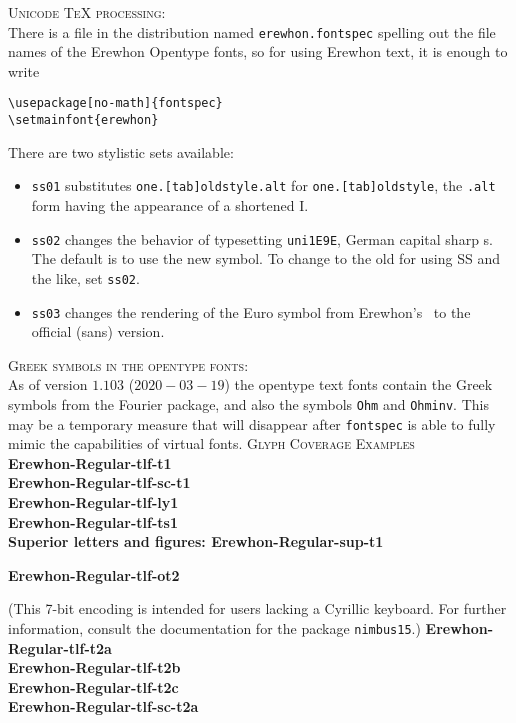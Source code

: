 \documentclass[11pt]{amsart}
\begin{document}
\textsc{Unicode TeX processing:}\\
There is a file in the distribution named {\tt erewhon.fontspec} spelling out the file names of the Erewhon Opentype fonts, so for using Erewhon text, it is enough to write
\begin{verbatim}
\usepackage[no-math]{fontspec}
\setmainfont{erewhon}
\end{verbatim}
There are two stylistic sets available:\\
\begin{itemize}
\item
{\tt ss01} substitutes {\tt one.[tab]oldstyle.alt} for {\tt one.[tab]oldstyle}, the {\tt .alt} form having the appearance of a shortened I.
\item
{\tt ss02} changes the behavior of typesetting {\tt uni1E9E}, German capital sharp s. The default is to use the new symbol. To change to the old for using SS and the like, set {\tt ss02}.
\item
{\tt ss03} changes the rendering of the Euro symbol from Erewhon's \texteuro\ to the official (sans) version.
\end{itemize} 



\textsc{Greek symbols in the opentype fonts:}\\
As of version $1.103$ ($2020-03-19$) the opentype text fonts contain the Greek symbols from the Fourier package, and also the symbols {\tt Ohm} and {\tt Ohminv}. This may be a temporary measure that will disappear after {\tt fontspec} is able to fully mimic the capabilities of virtual fonts.
\newpage
\textsc{Glyph Coverage Examples}\\
\textbf{Erewhon-Regular-tlf-t1}\\
\newpage
\textbf{Erewhon-Regular-tlf-sc-t1}\\
\newpage
\textbf{Erewhon-Regular-tlf-ly1}\\
\newpage
\textbf{Erewhon-Regular-tlf-ts1}\\
\newpage
\textbf{Superior letters and figures: Erewhon-Regular-sup-t1}\\
\newpage

\textbf{Erewhon-Regular-tlf-ot2}\\



(This 7-bit encoding is intended for users lacking a Cyrillic keyboard. For further information, consult the documentation for the package {\tt nimbus15}.)
\newpage
\textbf{Erewhon-Regular-tlf-t2a}\\
\newpage
\textbf{Erewhon-Regular-tlf-t2b}\\
\newpage
\textbf{Erewhon-Regular-tlf-t2c}\\
\newpage
\textbf{Erewhon-Regular-tlf-sc-t2a}\\
\end{document}
